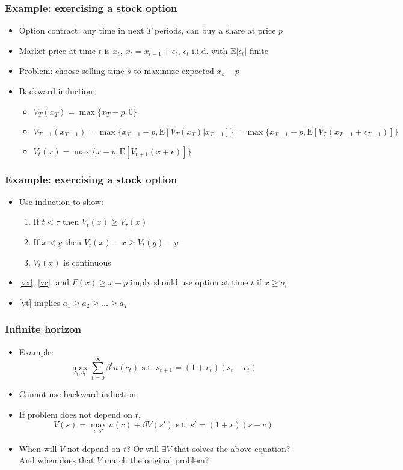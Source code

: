 \documentclass[compress]{beamer}
\newcommand{\Er}{\mathrm{E}}
\begin{document}
\begin{frame}\frametitle{Example: exercising a stock option}
  \begin{itemize}
  \item Option contract: any time in next $T$ periods, can buy a share
    at price $p$
  \item Market price at time $t$ is $x_t$, $x_t = x_{t-1} +
    \epsilon_t$, $\epsilon_t$ i.i.d. with $\Er|\epsilon_t|$ finite
  \item Problem: choose selling time $s$ to maximize expected $x_s -
    p$
  \item Backward induction:
    \begin{itemize}
    \item $V_T(x_T) = \max\{ x_T - p, 0 \}$
    \item $V_{T-1}(x_{T-1}) = \max\{ x_{T-1} - p, \Er[V_T(x_T) |
      x_{T-1}]\} = \max\{ x_{T-1} - p, \Er[V_T(x_{T-1} +
      \epsilon_{T-1}) ]\}$
    \item $V_t(x) = \max\{x - p, \Er[V_{t+1}(x + \epsilon) ] \}$    
    \end{itemize}
  \end{itemize}
\end{frame}

\begin{frame}\frametitle{Example: exercising a stock option}
  \begin{itemize}
  \item Use induction to show:
    \begin{enumerate}
    \item\label{vt} If $t < \tau$ then $V_t(x) \geq V_\tau(x)$
    \item\label{vx} If $x < y$ then $V_t(x) - x \geq V_t(y) - y$
    \item\label{vc} $V_t(x)$ is continuous
    \end{enumerate}
  \item \ref{vx}, \ref{vc}, and $F(x) \geq x-p$ imply should use
    option at time $t$ if $x \geq a_t$ 
  \item \ref{vt} implies $a_1 \geq a_2 \geq ... \geq a_T$
  \end{itemize}
\end{frame}

\begin{frame}\frametitle{Infinite horizon}
  \begin{itemize}
  \item Example:
    \[ \max_{c_t,s_t} \sum_{t=0}^\infty \beta^t u(c_t) \text{ s.t. } s_{t+1} =
    (1+r_t) (s_t - c_t) \]
  \item Cannot use backward induction
  \item If problem does not depend on $t$, 
    \[ V(s) = \max_{c,s'} u(c) + \beta V(s') \text{ s.t. } s' =
    (1+r)(s-c) \] 
  \item When will $V$ not depend on $t$? Or will $\exists V$ that
    solves the above equation? And when does that $V$ match the
    original problem?
  \end{itemize}
\end{frame}
\end{document}
